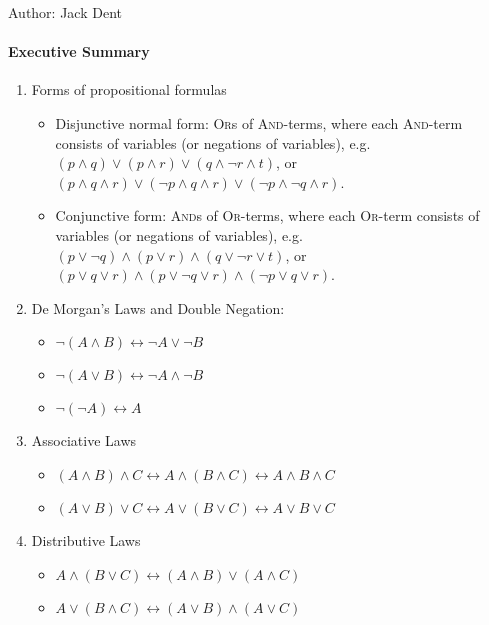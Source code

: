 \documentclass[solution, letterpaper]{cs20inclass}
\begin{document}

\noindent Author: Jack Dent%

\paragraph*{Executive Summary}
\begin{enumerate}

\item Forms of propositional formulas

\begin{itemize}
  \item  Disjunctive normal form: \textsc{Or}s of \textsc{And}-terms, where each \textsc{And}-term consists of variables (or negations of variables), e.g. $(p \land q) \lor (p \land r) \lor (q \land \lnot r \land t) $, or $(p \land q \land  r) \lor (\lnot p \land q \land r)\lor (\lnot p \land \lnot q \land r) $.
  \item Conjunctive form: \textsc{And}s of \textsc{Or}-terms, where each \textsc{Or}-term consists of variables (or negations of variables), e.g. $(p \lor \lnot q) \land (p \lor r) \land (q \lor \lnot r \lor t)$, or $(p \lor q \lor r) \land (p \lor \lnot q \lor r) \land (\lnot p \lor q \lor r)$.

\end{itemize}

\item De Morgan's Laws and Double Negation:
  \begin{itemize}
    \item $\lnot (A \land B) \longleftrightarrow \lnot A \lor \lnot B$
    \item $\lnot (A \lor B) \longleftrightarrow \lnot A \land \lnot B$
    \item $\lnot (\lnot A) \longleftrightarrow A$
  \end{itemize}

\item Associative Laws
  \begin{itemize}
    \item $(A \land B) \land C \longleftrightarrow A \land (B \land C) \longleftrightarrow A \land B \land C$
    \item $(A \lor B) \lor C \longleftrightarrow A \lor (B \lor C) \longleftrightarrow A \lor B \lor C$
  \end{itemize}

\item Distributive Laws
  \begin{itemize}
    \item $A \land (B \lor C) \longleftrightarrow (A \land B) \lor (A \land C)$
     \item $A \lor (B \land C) \longleftrightarrow (A \lor B) \land (A \lor C)$
  \end{itemize}


\end{enumerate}
\end{document}
